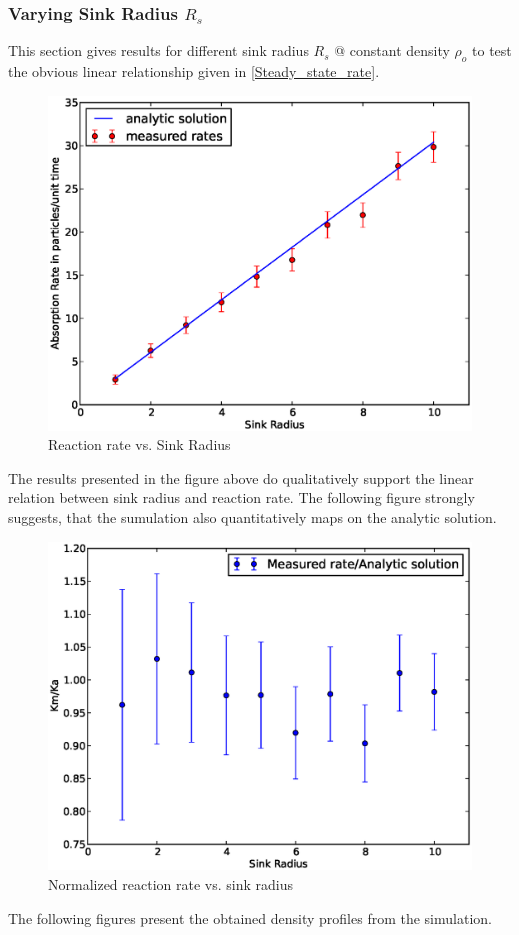 \subsubsection{Varying Sink Radius $R_s$}
This section gives results for different sink radius $R_s$ @ constant density $\rho_o$ to test the obvious linear relationship given in \eqref{Steady_state_rate}.
\begin{figure}[H]
    \centering
    \includegraphics[width = .7 \textwidth]{plots/np/rs/KabsRs.eps}
    \caption{Reaction rate vs. Sink Radius}
    \label{fig:KabsRs}
\end{figure}
The results presented in the figure above do qualitatively support the linear relation between sink radius and reaction rate.
The following figure strongly suggests, that the sumulation also quantitatively maps on the analytic solution.
\begin{figure}[H]
    \centering
    \includegraphics[width = .7 \textwidth]{plots/np/rs/KrelRs.eps}
    \caption{Normalized reaction rate vs. sink radius}
    \label{fig:KrelRs}
\end{figure}
The following figures present the obtained density profiles from the simulation.
